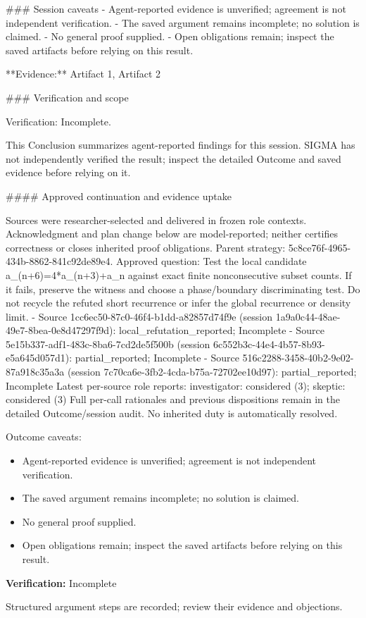 \documentclass[11pt]{article}
\begin{document}
\#\#\# Session caveats
- Agent-reported evidence is unverified; agreement is not independent verification.
- The saved argument remains incomplete; no solution is claimed.
- No general proof supplied.
- Open obligations remain; inspect the saved artifacts before relying on this result.

**Evidence:** Artifact 1, Artifact 2

\#\#\# Verification and scope

Verification: Incomplete.

This Conclusion summarizes agent-reported findings for this session. SIGMA has not independently verified the result; inspect the detailed Outcome and saved evidence before relying on it.

\#\#\#\# Approved continuation and evidence uptake

Sources were researcher-selected and delivered in frozen role contexts. Acknowledgment and plan change below are model-reported; neither certifies correctness or closes inherited proof obligations.
Parent strategy: 5c8ce76f-4965-434b-8862-841c92de89e4. Approved question: Test the local candidate a\_(n+6)=4*a\_(n+3)+a\_n against exact finite nonconsecutive subset counts. If it fails, preserve the witness and choose a phase/boundary discriminating test. Do not recycle the refuted short recurrence or infer the global recurrence or density limit.
- Source 1cc6ec50-87c0-46f4-b1dd-a82857d74f9e (session 1a9a0c44-48ae-49e7-8bea-0e8d47297f9d): local\_refutation\_reported; Incomplete
- Source 5e15b337-adf1-483c-8ba6-7cd2de5f500b (session 6c552b3c-44e4-4b57-8b93-e5a645d057d1): partial\_reported; Incomplete
- Source 516c2288-3458-40b2-9e02-87a918c35a3a (session 7c70ca6e-3fb2-4cda-b75a-72702ee10d97): partial\_reported; Incomplete
Latest per-source role reports: investigator: considered (3); skeptic: considered (3)
Full per-call rationales and previous dispositions remain in the detailed Outcome/session audit. No inherited duty is automatically resolved.\par
Outcome caveats:\par
\begin{itemize}
\item Agent-reported evidence is unverified; agreement is not independent verification.
\item The saved argument remains incomplete; no solution is claimed.
\item No general proof supplied.
\item Open obligations remain; inspect the saved artifacts before relying on this result.
\end{itemize}
\textbf{Verification:} Incomplete\par
Structured argument steps are recorded; review their evidence and objections.\par
\end{document}
